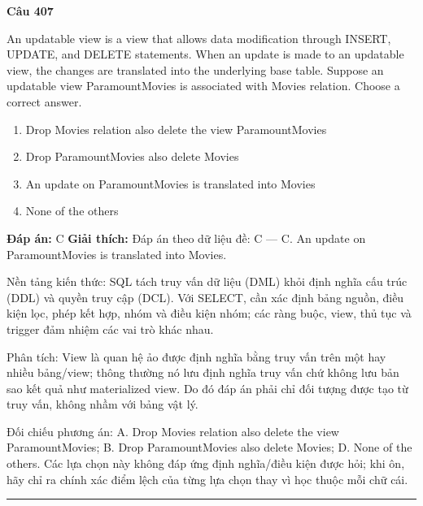 \documentclass[11pt,a4paper]{article}
\newenvironment{question}[1]{%
  \par\vspace{1em}\noindent\textbf{\large Câu #1}\par\vspace{0.4em}
}{%
  \par\vspace{1em}\hrule\vspace{0.6em}
}
\newenvironment{choices}{%
  \begin{enumerate}[label=\textbf{\Alph*.},leftmargin=2.2em,itemsep=2pt,topsep=3pt]
}{%
  \end{enumerate}
}
\newcommand{\choice}{\item}
\begin{document}
\begin{question}{407}
An updatable view is a view that allows data modification through INSERT, UPDATE, and DELETE statements. When an update is made to an updatable view, the changes are translated into the underlying base table.
Suppose an updatable view ParamountMovies is associated with Movies relation. Choose a correct answer.
\begin{choices}
\choice Drop Movies relation also delete the view ParamountMovies
\choice Drop ParamountMovies also delete Movies
\choice An update on ParamountMovies is translated into Movies
\choice None of the others
\end{choices}
\textbf{Đáp án:} C
\textbf{Giải thích:} Đáp án theo dữ liệu đề: C — C. An update on ParamountMovies is translated into Movies.

Nền tảng kiến thức: SQL tách truy vấn dữ liệu (DML) khỏi định nghĩa cấu trúc (DDL) và quyền truy cập (DCL). Với SELECT, cần xác định bảng nguồn, điều kiện lọc, phép kết hợp, nhóm và điều kiện nhóm; các ràng buộc, view, thủ tục và trigger đảm nhiệm các vai trò khác nhau.

Phân tích: View là quan hệ ảo được định nghĩa bằng truy vấn trên một hay nhiều bảng/view; thông thường nó lưu định nghĩa truy vấn chứ không lưu bản sao kết quả như materialized view. Do đó đáp án phải chỉ đối tượng được tạo từ truy vấn, không nhầm với bảng vật lý.

Đối chiếu phương án: A. Drop Movies relation also delete the view ParamountMovies; B. Drop ParamountMovies also delete Movies; D. None of the others. Các lựa chọn này không đáp ứng định nghĩa/điều kiện được hỏi; khi ôn, hãy chỉ ra chính xác điểm lệch của từng lựa chọn thay vì học thuộc mỗi chữ cái.
\end{question}
\end{document}
